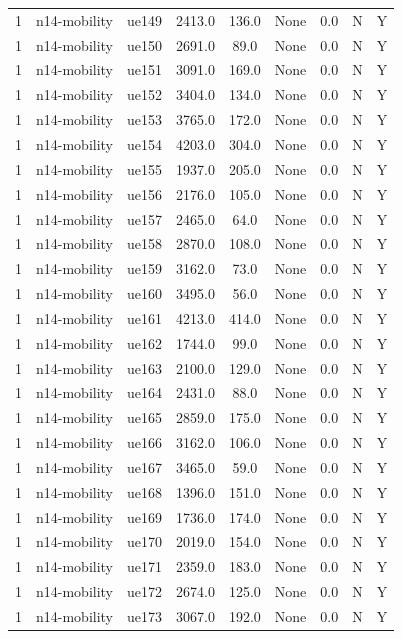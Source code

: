 \begin{table}[ht]
\begin{tabular}{|c|c|c|c|c|c|c|c|c|}
1 & n14-mobility & ue149 & 2413.0 & 136.0 & None & 0.0 & N & Y \\
1 & n14-mobility & ue150 & 2691.0 & 89.0 & None & 0.0 & N & Y \\
1 & n14-mobility & ue151 & 3091.0 & 169.0 & None & 0.0 & N & Y \\
1 & n14-mobility & ue152 & 3404.0 & 134.0 & None & 0.0 & N & Y \\
1 & n14-mobility & ue153 & 3765.0 & 172.0 & None & 0.0 & N & Y \\
1 & n14-mobility & ue154 & 4203.0 & 304.0 & None & 0.0 & N & Y \\
1 & n14-mobility & ue155 & 1937.0 & 205.0 & None & 0.0 & N & Y \\
1 & n14-mobility & ue156 & 2176.0 & 105.0 & None & 0.0 & N & Y \\
1 & n14-mobility & ue157 & 2465.0 & 64.0 & None & 0.0 & N & Y \\
1 & n14-mobility & ue158 & 2870.0 & 108.0 & None & 0.0 & N & Y \\
1 & n14-mobility & ue159 & 3162.0 & 73.0 & None & 0.0 & N & Y \\
1 & n14-mobility & ue160 & 3495.0 & 56.0 & None & 0.0 & N & Y \\
1 & n14-mobility & ue161 & 4213.0 & 414.0 & None & 0.0 & N & Y \\
1 & n14-mobility & ue162 & 1744.0 & 99.0 & None & 0.0 & N & Y \\
1 & n14-mobility & ue163 & 2100.0 & 129.0 & None & 0.0 & N & Y \\
1 & n14-mobility & ue164 & 2431.0 & 88.0 & None & 0.0 & N & Y \\
1 & n14-mobility & ue165 & 2859.0 & 175.0 & None & 0.0 & N & Y \\
1 & n14-mobility & ue166 & 3162.0 & 106.0 & None & 0.0 & N & Y \\
1 & n14-mobility & ue167 & 3465.0 & 59.0 & None & 0.0 & N & Y \\
1 & n14-mobility & ue168 & 1396.0 & 151.0 & None & 0.0 & N & Y \\
1 & n14-mobility & ue169 & 1736.0 & 174.0 & None & 0.0 & N & Y \\
1 & n14-mobility & ue170 & 2019.0 & 154.0 & None & 0.0 & N & Y \\
1 & n14-mobility & ue171 & 2359.0 & 183.0 & None & 0.0 & N & Y \\
1 & n14-mobility & ue172 & 2674.0 & 125.0 & None & 0.0 & N & Y \\
1 & n14-mobility & ue173 & 3067.0 & 192.0 & None & 0.0 & N & Y \\

\end{tabular}
\end{table}
